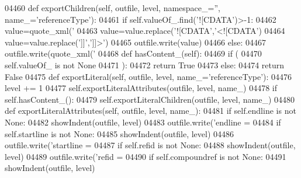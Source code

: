 \begin{DoxyCode}
{{{{{{{{{{{{{{{{{{{{{{{{{{{{{{{{{{{{{{{{{{{{{{{{{{{{{{{{{{{{{{{{{{{{{{{{{{{{{{{{{{{{{{{{{{{{{{{{{{{{{{{{{{{{{{{{{{{{{{{{{{{{{{{{{{{{{{{{{{{{{{{{{{{{{{{{{{{{{{{{{{{{{{{{{{{{{{{{{{{{{{{{{{{{{{{{{{{{{{{{{{{{{{{{{{{{{{{{{{{{{{{{{{{{{{{{{{{{{{{{{{{{{{{{{{{{{{{{{{{{{{{{{{{{{{{{{{{{{{{{{{{{{{{{{{{{{04460     \textcolor{keyword}{def }exportChildren(self, outfile, level, namespace\_='', name\_='referenceType'):
04461         \textcolor{keywordflow}{if} self.valueOf\_.find(\textcolor{stringliteral}{'![CDATA'})>-1:
04462             value=quote_xml(\textcolor{stringliteral}{'%
04463             value=value.replace(\textcolor{stringliteral}{'![CDATA'},\textcolor{stringliteral}{'<![CDATA'})
04464             value=value.replace(\textcolor{stringliteral}{']]'},\textcolor{stringliteral}{']]>'})
04465             outfile.write(value)
04466         \textcolor{keywordflow}{else}:
04467             outfile.write(quote_xml(\textcolor{stringliteral}{'%
04468     \textcolor{keyword}{def }hasContent_(self):
04469         \textcolor{keywordflow}{if} (
04470             self.valueOf_ \textcolor{keywordflow}{is} \textcolor{keywordflow}{not} \textcolor{keywordtype}{None}
04471             ):
04472             \textcolor{keywordflow}{return} \textcolor{keyword}{True}
04473         \textcolor{keywordflow}{else}:
04474             \textcolor{keywordflow}{return} \textcolor{keyword}{False}
04475     \textcolor{keyword}{def }exportLiteral(self, outfile, level, name\_='referenceType'):
04476         level += 1
04477         self.exportLiteralAttributes(outfile, level, name\_)
04478         \textcolor{keywordflow}{if} self.hasContent_():
04479             self.exportLiteralChildren(outfile, level, name\_)
04480     \textcolor{keyword}{def }exportLiteralAttributes(self, outfile, level, name\_):
04481         \textcolor{keywordflow}{if} self.endline \textcolor{keywordflow}{is} \textcolor{keywordflow}{not} \textcolor{keywordtype}{None}:
04482             showIndent(outfile, level)
04483             outfile.write(\textcolor{stringliteral}{'endline = %
04484         \textcolor{keywordflow}{if} self.startline \textcolor{keywordflow}{is} \textcolor{keywordflow}{not} \textcolor{keywordtype}{None}:
04485             showIndent(outfile, level)
04486             outfile.write(\textcolor{stringliteral}{'startline = %
04487         \textcolor{keywordflow}{if} self.refid \textcolor{keywordflow}{is} \textcolor{keywordflow}{not} \textcolor{keywordtype}{None}:
04488             showIndent(outfile, level)
04489             outfile.write(\textcolor{stringliteral}{'refid = %
04490         \textcolor{keywordflow}{if} self.compoundref \textcolor{keywordflow}{is} \textcolor{keywordflow}{not} \textcolor{keywordtype}{None}:
04491             showIndent(outfile, level)
}}}}}}}}}}}}}}}}}}}}}}}}}}}}}}}}}}}}}}}}}}}}}}}}}}}}}}}}}}}}}}}}}}}}}}}}}}}}}}}}}}}}}}}}}}}}}}}}}}}}}}}}}}}}}}}}}}}}}}}}}}}}}}}}}}}}}}}}}}}}}}}}}}}}}}}}}}}}}}}}}}}}}}}}}}}}}}}}}}}}}}}}}}}}}}}}}}}}}}}}}}}}}}}}}}}}}}}}}}}}}}}}}}}}}}}}}}}}}}}}}}}}}}}}}}}}}}}}}}}}}}}}}}}}}}}}}}}}}}}}}}}}}}}}}}}}}}}}}}
\end{DoxyCode}
